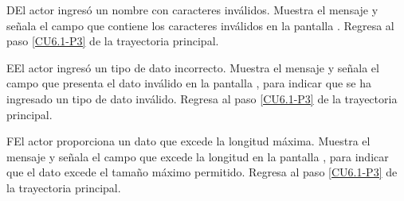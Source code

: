 	\begin{UCtrayectoriaA}{D}{El actor ingresó un nombre con caracteres inválidos.}
	\UCpaso[\UCsist] Muestra el mensaje  y señala el campo que contiene los caracteres inválidos en la pantalla .
	\UCpaso Regresa al paso \ref{CU6.1-P3} de la trayectoria principal.
	\end{UCtrayectoriaA}

	\begin{UCtrayectoriaA}{E}{El actor ingresó un tipo de dato incorrecto.}
	\UCpaso[\UCsist] Muestra el mensaje  y señala el campo que presenta el dato inválido en la pantalla , para indicar que se ha ingresado un tipo de dato inválido.
	\UCpaso Regresa al paso \ref{CU6.1-P3} de la trayectoria principal.
	\end{UCtrayectoriaA}


	\begin{UCtrayectoriaA}{F}{El actor proporciona un dato que excede la longitud máxima.}
		\UCpaso[\UCsist] Muestra el mensaje  y señala el campo que excede la longitud en la pantalla , para indicar que el dato excede el tamaño máximo permitido.
		\UCpaso Regresa al paso \ref{CU6.1-P3} de la trayectoria principal.
	\end{UCtrayectoriaA}
